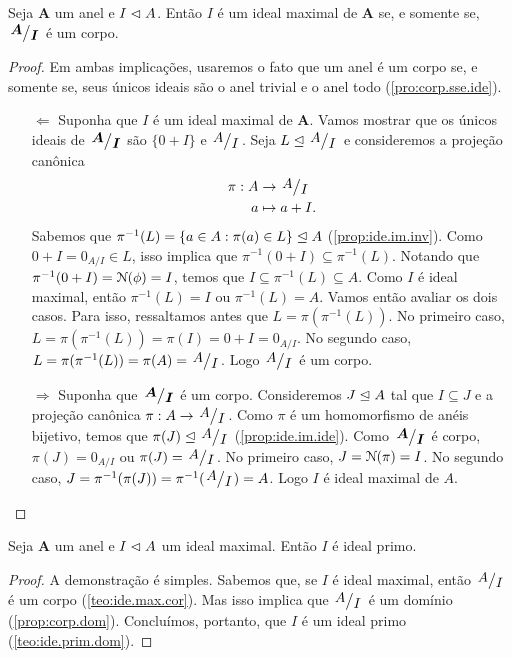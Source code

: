\begin{teo}
\label{teo:ide.max.cor}
	Seja $\bm A$ um anel e $I \mathrel{\lhd} A$. Então $I$ é um ideal maximal de $\bm A$ se, e somente se, $\bm{\quo{A}{I}}$ é um corpo.
\end{teo}
\begin{proof} Em ambas implicações, usaremos o fato que um anel é um corpo se, e somente se, seus únicos ideais são o anel trivial e o anel todo (\ref{pro:corp.sse.ide}).
	\begin{enumerate}
	\item[$\Leftarrow$] Suponha que $I$ é um ideal maximal de $\bm A$.  Vamos mostrar que os únicos ideais de $\bm{\quo{A}{I}}$ são $\{0+I\}$ e $\quo{A}{I}$. Seja $L \ide \quo{A}{I}$ e consideremos a projeção canônica
	\begin{align*}
	\pi: A &\to \quo{A}{I} \\
		a &\mapsto a+I.
	\end{align*}
Sabemos que $\pi^{-1}(L)=\{a \in A : \pi(a) \in L\} \mathrel{\unlhd} A$ (\ref{prop:ide.im.inv}). Como $0+I=0_{A/I} \in L$, isso implica que $\pi^{-1}(0+I) \subseteq \pi^{-1}(L)$. Notando que $\pi^{-1}(0+I)=\mathcal{N}(\phi)=I$, temos que $I \subseteq \pi^{-1}(L) \subseteq A$. Como $I$ é ideal maximal, então $\pi^{-1}(L)=I$ ou $\pi^{-1}(L)=A$. Vamos então avaliar os dois casos. Para isso, ressaltamos antes que $L=\pi(\pi^{-1}(L))$. No primeiro caso, $L=\pi(\pi^{-1}(L))=\pi(I)=0+I=0_{A/I}$. No segundo caso, $L=\pi(\pi^{-1}(L))=\pi(A)=\quo{A}{I}$. Logo $\quo{A}{I}$ é um corpo.
	\item[$\Rightarrow$] Suponha que $\bm{\quo{A}{I}}$ é um corpo. Consideremos $J \mathrel{\unlhd} A$ tal que $I \subseteq J$ e a projeção canônica $\pi: A \to \quo{A}{I}$. Como $\pi$ é um homomorfismo de anéis bijetivo, temos que $\pi(J) \ide \quo{A}{I}$ (\ref{prop:ide.im.ide}). Como $\bm{\quo{A}{I}}$ é corpo, $\pi(J)={0_{A/I}}$ ou $\pi(J)=\quo{A}{I}$. No primeiro caso, $J=\mathcal{N}(\pi)=I$. No segundo caso, $J=\pi^{-1}(\pi(J))=\pi^{-1}(\quo{A}{I})=A$. Logo $I$ é ideal maximal de $A$.
	\end{enumerate}
\end{proof}

\begin{prop}
	Seja $\bm A$ um anel e $I \mathrel{\lhd} A$ um ideal maximal. Então $I$ é ideal primo.
\end{prop}
\begin{proof}
	A demonstração é simples. Sabemos que, se $I$ é ideal maximal, então $\quo{A}{I}$ é um corpo (\ref{teo:ide.max.cor}). Mas isso implica que $\quo{A}{I}$ é um domínio (\ref{prop:corp.dom}). Concluímos, portanto, que $I$ é um ideal primo (\ref{teo:ide.prim.dom}).
\end{proof}

